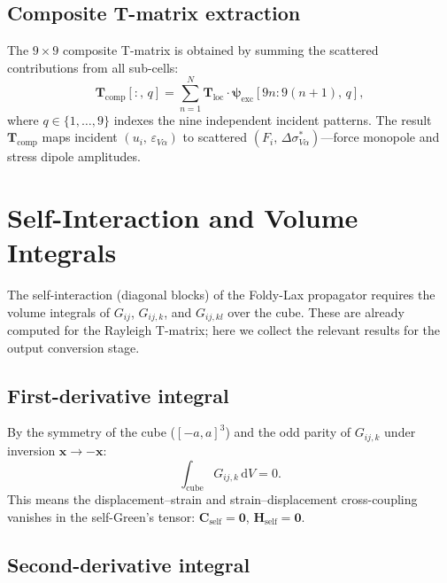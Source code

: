 \documentclass[11pt,a4paper]{article}
\newcommand{\bx}{\mathbf{x}}
\newcommand{\dd}{\mathrm{d}}
\newcommand{\bT}{\mathbf{T}}
\newcommand{\bC}{\mathbf{C}}
\newcommand{\bH}{\mathbf{H}}
\newcommand{\bpsi}{\boldsymbol{\psi}}
\begin{document}
\subsection{Composite T-matrix extraction}

The $9 \times 9$ composite T-matrix is obtained by summing the
scattered contributions from all sub-cells:
\begin{equation}
  \bT_\text{comp}[:,\,q]
  = \sum_{n=1}^{N} \bT_\text{loc} \cdot
    \bpsi_\text{exc}[9n{:}9(n{+}1),\,q],
  \label{eq:Tcomp}
\end{equation}
where $q \in \{1,\ldots,9\}$ indexes the nine independent incident
patterns.  The result $\bT_\text{comp}$ maps incident
$(u_i,\,\varepsilon_{V\alpha})$ to scattered
$(F_i,\,\Delta\sigma^*_{V\alpha})$---force monopole and stress dipole
amplitudes.

\section{Self-Interaction and Volume Integrals}
\label{sec:self}

The self-interaction (diagonal blocks) of the Foldy-Lax propagator
requires the volume integrals of $G_{ij}$, $G_{ij,k}$, and
$G_{ij,kl}$ over the cube.  These are already computed for the
Rayleigh T-matrix; here we collect the relevant results for the
output conversion stage.

\subsection{First-derivative integral}

By the symmetry of the cube ($[-a,a]^3$) and the odd parity of
$G_{ij,k}$ under inversion $\bx \to -\bx$:
\begin{equation}
  \int_{\text{cube}} G_{ij,k}\,\dd V = 0.
  \label{eq:Gd_vanish}
\end{equation}
This means the displacement--strain and strain--displacement
cross-coupling vanishes in the self-Green's tensor: $\bC_\text{self}
= \mathbf{0}$, $\bH_\text{self} = \mathbf{0}$.

\subsection{Second-derivative integral}
\end{document}
